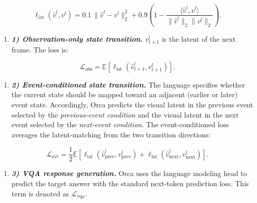 \vspace{-2ex}
\begin{equation}\label{eq:appendix_latent_matching} 
\ell_{\mathrm{lat}}(\hat{v}^l,v^l) = 0.1\,\|\hat{v}^l-v^l\|_2^2 + 0.9 \left( 1- \frac{\langle \hat{v}^l, v^l\rangle} {\|\hat{v}^l\|_2\|v^l\|_2} \right). 
\end{equation}

\begin{enumerate}[
    leftmargin=1.35em,
    itemsep=0.35em,
    topsep=0.35em,
    parsep=0em
]
    \item[] \textit{\textbf{1) Observation-only state transition.}} \(v^l_{t+1}\) is the latent of the next frame. The loss is:
\end{enumerate}


\begin{equation} 
\mathcal{L}_{\mathrm{obs}} = \mathbb{E} \left[ \ell_{\mathrm{lat}} \left( \hat{v}^l_{t+1}, v^l_{t+1} \right) \right]. \label{eq:appendix_obs_loss} 
\end{equation}

\vspace{-2ex}
\begin{enumerate}[
    leftmargin=1.35em,
    itemsep=0.35em,
    topsep=0.35em,
    parsep=0em
]
    \item[] \textit{\textbf{2) Event-conditioned state transition.}} The language specifies whether the current state should be mapped toward an adjacent (earlier or later) event state. Accordingly, Orca predicts the visual latent in the previous event selected by the \textit{previous-event condition} and the visual latent in the next event selected by the \textit{next-event condition}. The event-conditioned loss averages the latent-matching from the two transition directions:
\end{enumerate}

\vspace{-2ex}
\begin{equation} 
\mathcal{L}_{\mathrm{evt}} = \frac{1}{2} \mathbb{E} \left[ \ell_{\mathrm{lat}} \left( \hat{v}^l_{\mathrm{prev}}, v^l_{\mathrm{prev}} \right) + \ell_{\mathrm{lat}} \left( \hat{v}^l_{\mathrm{next}}, v^l_{\mathrm{next}} \right) \right]. 
\label{eq:appendix_event_loss}
\end{equation} 

\begin{enumerate}[
    leftmargin=1.35em,
    itemsep=0.35em,
    topsep=0.35em,
    parsep=0em
]
    \item[] \textit{\textbf{3) VQA response generation.}} Orca uses the language modeling head to predict the target answer with the standard next-token prediction loss. This term is denoted as \(\mathcal{L}_{\mathrm{vqa}}\).
\end{enumerate}

